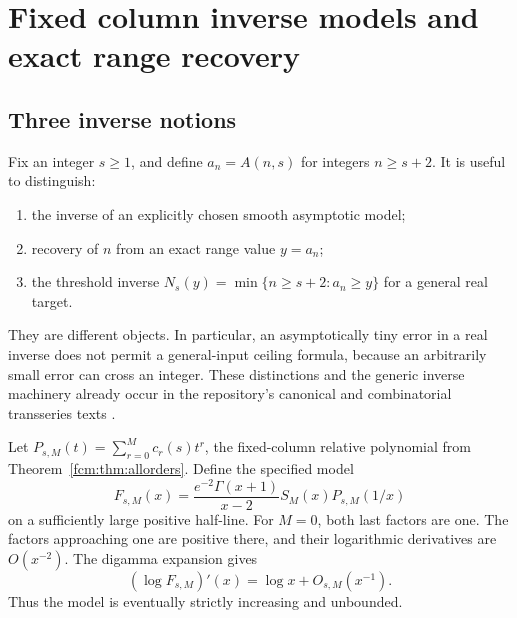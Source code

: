 \documentclass[11pt,letterpaper]{article}
\theoremstyle{remark}\newtheorem{remark}[theorem]{Remark}
\begin{document}
\section{Fixed column inverse models and exact range recovery}
\subsection{Three inverse notions}
Fix an integer $s\ge1$, and define $a_n=A(n,s)$ for integers $n\ge s+2$. It is useful to distinguish:
\begin{enumerate}[label=(\roman*)]
\item the inverse of an explicitly chosen smooth asymptotic model;
\item recovery of $n$ from an exact range value $y=a_n$;
\item the threshold inverse $N_s(y)=\min\{n\ge s+2:a_n\ge y\}$ for a general real target.
\end{enumerate}
They are different objects. In particular, an asymptotically tiny error in a real inverse does not permit a general-input ceiling formula, because an arbitrarily small error can cross an integer. These distinctions and the generic inverse machinery already occur in the repository's canonical and combinatorial transseries texts \cite{canonical,combinatorial}.

Let $P_{s,M}(t)=\sum_{r=0}^M c_r(s)t^r$, the fixed-column relative polynomial from Theorem~\ref{fcm:thm:allorders}. Define the specified model
\begin{equation}\label{fcm:eq:model}
 F_{s,M}(x)=\frac{e^{-2}\Gamma(x+1)}{x-2}
 S_M(x)P_{s,M}(1/x)
\end{equation}
on a sufficiently large positive half-line. For $M=0$, both last factors are one. The factors approaching one are positive there, and their logarithmic derivatives are $O(x^{-2})$. The digamma expansion gives
\begin{equation}\label{fcm:eq:derivative}
 (\log F_{s,M})'(x)=\log x+O_{s,M}(x^{-1}).
\end{equation}
Thus the model is eventually strictly increasing and unbounded.
\end{document}
